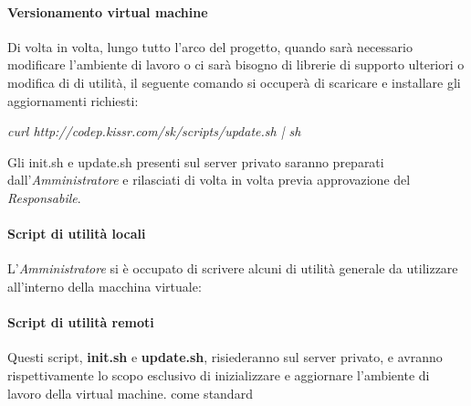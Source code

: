 \documentclass{scalatekids-article}
\begin{document}
\paragraph{Versionamento virtual machine}
Di volta in volta, lungo tutto l'arco del progetto, quando sarà necessario
modificare l'ambiente di lavoro o ci sarà bisogno di librerie di supporto
ulteriori o modifica di  di utilità, il seguente comando si
occuperà di scaricare e installare gli aggiornamenti richiesti:
\begin{center}
  \textit{curl http://codep.kissr.com/sk/scripts/update.sh | sh}
\end{center}
Gli  init.sh e update.sh presenti sul server privato saranno
preparati dall'\textit{Amministratore} e rilasciati di volta in volta previa
approvazione del \textit{Responsabile}.
\paragraph{Script di utilità locali}
\label{sec:script}
L'\textit{Amministratore} si è occupato di scrivere alcuni  di utilità
generale da utilizzare all'interno della macchina virtuale:
\paragraph{Script di utilità remoti}
Questi script, \textbf{init.sh} e \textbf{update.sh}, risiederanno sul server
privato, e avranno rispettivamente lo scopo esclusivo di inizializzare e
aggiornare l'ambiente di lavoro della virtual machine.
come standard
\end{document}
